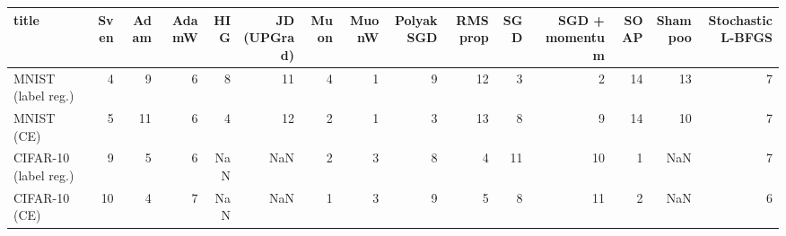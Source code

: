\begin{tabular}{lrrrrrrrrrrrrrr}
\toprule
title & Sven & Adam & AdamW & HIG & JD (UPGrad) & Muon & MuonW & Polyak SGD & RMSprop & SGD & SGD + momentum & SOAP & Shampoo & Stochastic L-BFGS \\
\midrule
MNIST (label reg.) & 4 & 9 & 6 & 8 & 11 & 4 & 1 & 9 & 12 & 3 & 2 & 14 & 13 & 7 \\
MNIST (CE) & 5 & 11 & 6 & 4 & 12 & 2 & 1 & 3 & 13 & 8 & 9 & 14 & 10 & 7 \\
CIFAR-10 (label reg.) & 9 & 5 & 6 & NaN & NaN & 2 & 3 & 8 & 4 & 11 & 10 & 1 & NaN & 7 \\
CIFAR-10 (CE) & 10 & 4 & 7 & NaN & NaN & 1 & 3 & 9 & 5 & 8 & 11 & 2 & NaN & 6 \\
\bottomrule
\end{tabular}
